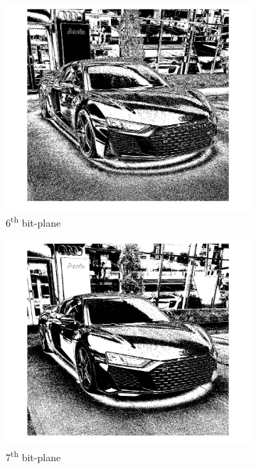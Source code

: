 \documentclass[conference]{IEEEtran}
\begin{document}
\begin{figure}[h!]
\begin{subfigure}[b]{0.3\linewidth}
\includegraphics[width=\linewidth]{images/img9.jpg}
\caption{6\textsuperscript{th} bit-plane}
\end{subfigure}
\begin{subfigure}[b]{0.3\linewidth}
\includegraphics[width=\linewidth]{images/img10.jpg}
\caption{7\textsuperscript{th} bit-plane}
\end{subfigure}
\begin{subfigure}[b]{0.3\linewidth}

\end{subfigure}
\end{figure}
\end{document}
